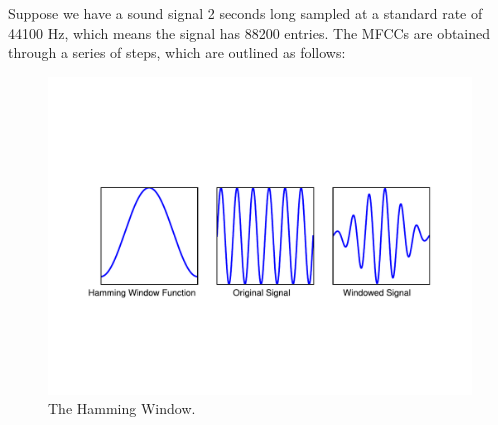 Suppose we have a sound signal 2 seconds long sampled at a standard rate of 44100 Hz, which means the
signal has 88200 entries. The  MFCCs are obtained through a series of steps, which are outlined
as follows:
\begin{figure}
\centering
\includegraphics[width=\textwidth]{Hamming.pdf}
\caption{The Hamming Window.}
\label{fourierext:ham}
\end{figure}
